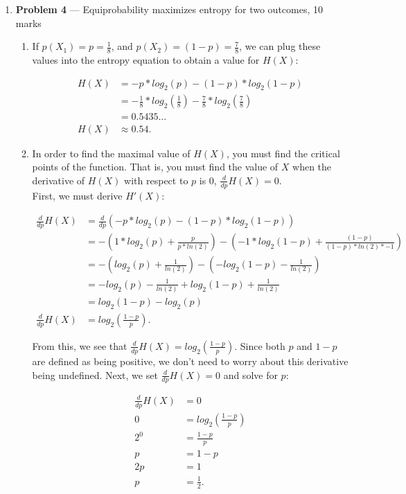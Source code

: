 \documentclass[11pt]{article}
\theoremstyle{definition}
\begin{document}
\begin{enumerate}
\begin{enumerate}
\end{enumerate}

\newpage

\item[] \textbf{Problem 4} --- Equiprobability maximizes entropy for two outcomes, 10 marks
\begin{enumerate}
\item If $p(X_1) = p = \frac{1}{8}$, and $p(X_2) = (1 - p) = \frac{7}{8}$, we can plug these values into the entropy equation to obtain a value for $H(X)$:

\begin{align*}
H(X) &= -p * log_2(p) - (1 - p) * log_2(1 - p)\\
&= -\frac{1}{8} * log_2(\frac{1}{8}) - \frac{7}{8} *  log_2(\frac{7}{8})\\
&= 0.5435 \ldots \\
H(X) &\approx 0.54.
\end{align*}

\item In order to find the maximal value of $H(X)$, you must find the critical points of the function. That is, you must find the value of $X$ when the derivative of $H(X)$ with respect to $p$
is 0, $\frac{d}{dp}H(X) = 0$.\\

First, we must derive $H'(X)$:

\begin{align*}
\frac{d}{dp}H(X) &= \frac{d}{dp}(-p * log_2(p) - (1 - p) * log_2(1 - p))\\
&= -(1 * log_2(p) + \frac{p}{p * ln(2)}) - (-1 * log_2(1 - p) + \frac{(1 - p)}{(1 - p) * ln(2) * -1})\\
&= -(log_2(p) + \frac{1}{ln(2)}) - (-log_2(1 - p) - \frac{1}{ln(2)})\\
&= -log_2(p) - \frac{1}{ln(2)} + log_2(1 - p) + \frac{1}{ln(2)}\\
&= log_2(1 - p) - log_2(p)\\
\frac{d}{dp}H(X) &= log_2(\frac{1 - p}{p}).
\end{align*}

From this, we see that $\frac{d}{dp}H(X) = log_2(\frac{1 - p}{p})$. Since both $p$ and $1 - p$ are defined as being positive, we don't need to worry about this derivative being undefined.
Next, we set $\frac{d}{dp}H(X) = 0$ and solve for $p$:

\begin{align*}
\frac{d}{dp}H(X) &= 0\\
0 &= log_2(\frac{1 - p}{p})\\
2^0 &= \frac{1 - p}{p}\\
p &= 1 - p\\
2p &= 1\\
p &= \frac{1}{2}.
\end{align*}


\end{enumerate}
\end{enumerate}
\end{document}
